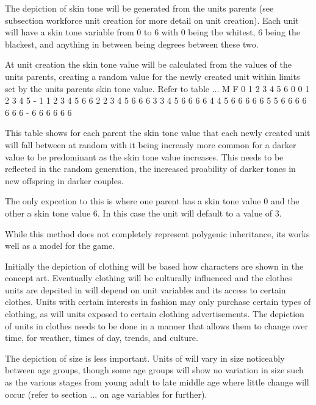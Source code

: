 The depiction of skin tone will be generated from the units parents (see subsection workforce unit creation for more detail on unit creation). 
Each unit will have a skin tone variable from 0 to 6 with 0 being the whitest, 6 being the blackest, and anything in between being degrees between these two. 

At unit creation the skin tone value will be calculated from the values of the units parents, creating a random value for the newly created unit within limits set by the units parents skin tone value. Refer to table ... 
   M 
F  0 1 2 3 4 5 6
0  0 1 2 3 4 5 - 
1  1 2 3 4 5 6 6
2  2 3 4 5 6 6 6
3  3 4 5 6 6 6 6
4  4 5 6 6 6 6 6
5  5 6 6 6 6 6 6
6  - 6 6 6 6 6 6 

This table shows for each parent the skin tone value that each newly created unit will fall between at random with it being increasly more common for a darker value to be predominant as the skin tone value increases. This needs to be reflected in the random generation, the increased proability of darker tones in new offspring in darker couples.

The only expcetion to this is where one parent has a skin tone value 0 and the other a skin tone value 6. In this case the unit will default to a value of 3.

While this method does not completely represent polygenic inheritance, its works well as a model for the game.  


Initially the depiction of clothing will be based how characters are shown in the concept art. Eventually clothing will be culturally influenced and the clothes units are depcited in will depend on unit variables and its access to certain clothes. Units with certain interests in fashion may only purchase certain types of clothing, as will units exposed to certain clothing advertisements. The depiction of units in clothes needs to be done in a manner that allows them to change over time, for weather, times of day, trends, and culture.  

The depiction of size is less important. Units of will vary in size noticeably between age groups, though some age groups will show no variation in size such as the various stages from young adult to late middle age where little change will occur (refer to section ... on age variables for further). 

